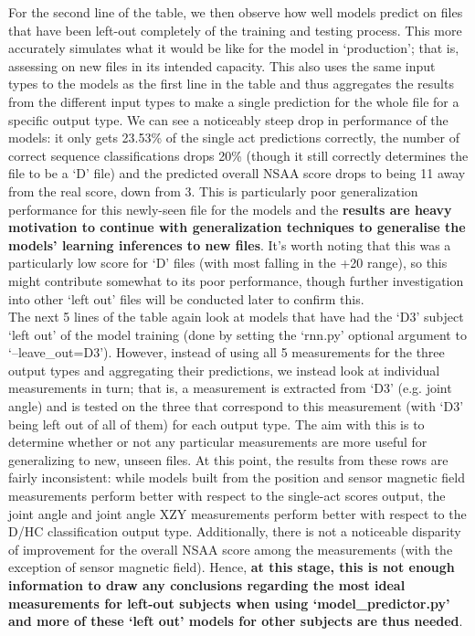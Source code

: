 \documentclass[12pt,twoside]{report}
\begin{document}
\quad For the second line of the table, we then observe how well models predict on files that have been left-out completely of the training and testing process. This more accurately simulates what it would be like for the model in ‘production’; that is, assessing on new files in its intended capacity. This also uses the same input types to the models as the first line in the table and thus aggregates the results from the different input types to make a single prediction for the whole file for a specific output type. We can see a noticeably steep drop in performance of the models: it only gets 23.53\% of the single act predictions correctly, the number of correct sequence classifications drops 20\% (though it still correctly determines the file to be a ‘D’ file) and the predicted overall NSAA score drops to being 11 away from the real score, down from 3. This is particularly poor generalization performance for this newly-seen file for the models and the \textbf{results are heavy motivation to continue with generalization techniques to generalise the models’ learning inferences to new files}. It’s worth noting that this was a particularly low score for ‘D’ files (with most falling in the +20 range), so this might contribute somewhat to its poor performance, though further investigation into other ‘left out’ files will be conducted later to confirm this.\\

\quad The next 5 lines of the table again look at models that have had the ‘D3’ subject ‘left out’ of the model training (done by setting the ‘rnn.py’ optional argument to ‘--leave\_out=D3’). However, instead of using all 5 measurements for the three output types and aggregating their predictions, we instead look at individual measurements in turn; that is, a measurement is extracted from ‘D3’ (e.g. joint angle) and is tested on the three that correspond to this measurement (with ‘D3’ being left out of all of them) for each output type. The aim with this is to determine whether or not any particular measurements are more useful for generalizing to new, unseen files. At this point, the results from these rows are fairly inconsistent: while models built from the position and sensor magnetic field measurements perform better with respect to the single-act scores output, the joint angle and joint angle XZY measurements perform better with respect to the D/HC classification output type. Additionally, there is not a noticeable disparity of improvement for the overall NSAA score among the measurements (with the exception of sensor magnetic field). Hence, \textbf{at this stage, this is not enough information to draw any conclusions regarding the most ideal measurements for left-out subjects when using ‘model\_predictor.py’ and more of these ‘left out’ models for other subjects are thus needed}.\\
\end{document}
